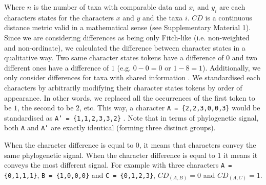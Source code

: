 \documentclass[12pt,letterpaper]{article}
\begin{document}
\noindent Where $n$ is the number of taxa with comparable data and $x_i$ and $y_i$ are each characters states for the characters $x$ and $y$ and the taxa $i$.
$CD$ is a continuous distance metric valid in a mathematical sense (see Supplementary Material 1).
Since we are considering differences as being only Fitch-like (i.e. non-weighted and non-ordinate), we calculated the difference between character states in a qualitative way.
Two same character states tokens have a difference of $0$ and two different ones have a difference of $1$ (e.g. $0 - 0 = 0$ or $1 - 8 = 1$).
Additionally, we only consider differences for taxa with shared information \citep[i.e. a Gower distance;][]{GowerDist}.
We standardised each characters by arbitrarily modifying their character states tokens by order of appearance.
In other words, we replaced all the occurrences of the first token to be $1$, the second to be $2$, etc.
This way, a character \texttt{A = \{2,2,3,0,0,3\}} would be standardised as \texttt{A' = \{1,1,2,3,3,2\}} \citep[following the \textit{xyz} notation in][p.13]{felsenstein2004inferring}.
Note that in terms of phylogenetic signal, both \texttt{A} and \texttt{A'} are exactly identical (forming three distinct groups).

When the character difference is equal to $0$, it means that characters convey the same phylogenetic signal.
When the character difference is equal to $1$ it means it conveys the most different signal.
For example with three characters \texttt{A = \{0,1,1,1\}}, \texttt{B = \{1,0,0,0\}} and \texttt{C = \{0,1,2,3\}}, $CD_{(A,B)} = 0$ and $CD_{(A,C)} = 1$.
\end{document}
